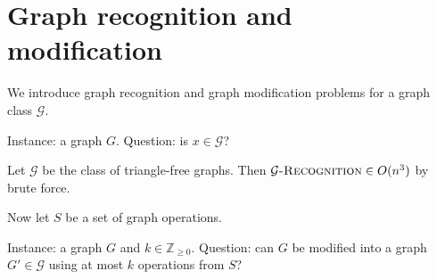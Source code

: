 \section{Graph recognition and modification}

We introduce graph recognition and graph modification problems for a graph class $\mathcal G$. 

\begin{problem}
  Instance: a graph $G$. \newline 
  Question: is $x \in \mathcal G$?
\end{problem}

\begin{example}
  Let $\mathcal G$ be the class of triangle-free graphs. Then $\text{\normalfont \textsc{$\mathcal G$-Recognition}} \in O(n^3)$ by brute force.  
\end{example}

Now let $S$ be a set of graph operations.

\begin{problem}
  Instance: a graph $G$ and $k \in \mathbb Z_{\geq 0}$. \newline 
  Question: can $G$ be modified into a graph $G' \in \mathcal G$ using at most $k$ operations from $S$?
\end{problem}

\begin{example}
  
\end{example}